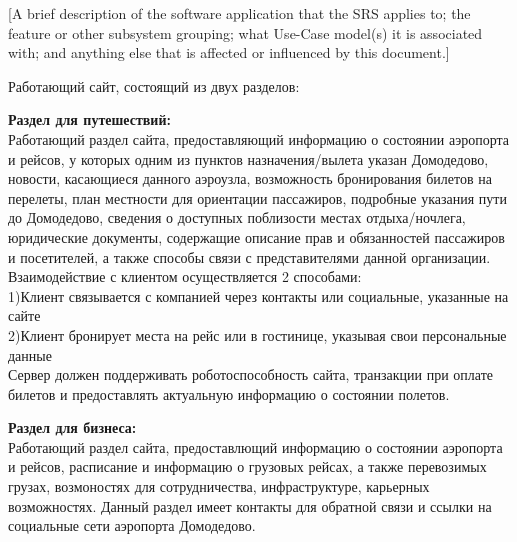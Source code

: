 [A brief description of the software application 
that the SRS applies to; the feature or other 
subsystem grouping; what Use-Case model(s) it 
is associated with;  and anything else that is 
affected or influenced by this document.]

Работающий сайт, состоящий из двух разделов:\newline

\textbf{Раздел для путешествий:}\\
Работающий раздел сайта, предоставляющий информацию о состоянии аэропорта и рейсов, у которых одним из пунктов назначения/вылета указан Домодедово, 
новости, касающиеся данного аэроузла, возможность бронирования билетов на перелеты, план местности для ориентации пассажиров,
подробные указания пути до Домодедово, сведения о доступных поблизости местах отдыха/ночлега, юридические документы, содержащие описание 
прав и обязанностей пассажиров и посетителей, а также способы связи с представителями данной организации.
Взаимодействие с клиентом осуществляется 2 способами:\\
1)Клиент связывается с компанией через контакты или социальные, указанные на сайте\\
2)Клиент бронирует места на рейс или в гостинице, указывая свои персональные данные\\
Сервер должен поддерживать роботоспособность сайта, транзакции при оплате билетов и предоставлять актуальную информацию о состоянии полетов.\newline

\textbf{Раздел для бизнеса:}\\
Работающий раздел сайта, предоставлющий информацию о состоянии аэропорта и рейсов, расписание и информацию о грузовых рейсах, 
а также перевозимых грузах, возмоностях для сотрудничества, инфраструктуре, карьерных возможностях. Данный раздел имеет контакты для обратной связи
и ссылки на социальные сети аэропорта Домодедово.
